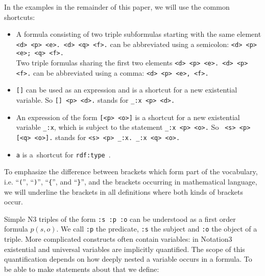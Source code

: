 In the examples in the remainder of this paper, we will use the common \rdf shortcuts:

\begin{remark}
\begin{itemize}
\item A formula consisting of two triple subformulas starting with the same element \verb!<d> <p> <e>. <d> <q> <f>.! can be abbreviated using a semicolon: \verb!<d> <p> <e>; <q> <f>.!\\ 
Two triple formulas sharing the first two elements  \verb!<d> <p> <e>. <d> <p> <f>.! can be abbreviated using a comma: \verb!<d> <p> <e>, <f>.!
  \item \verb![]! can be used as an expression and is a shortcut for a new existential variable. So \verb![] <p> <d>.! stands for \verb!_:x <p> <d>.!
 \item An expression of the form \verb![<p> <o>]! is a shortcut for a new existential variable \verb!_:x!,
   which is subject to the statement \verb!_:x <p> <o>.!
   So \verb! <s> <p> [<q> <o>].! stands for \verb!<s> <p> _:x. _:x <q> <o>.!
 \item \verb!a! is a~shortcut for \verb!rdf:type!~\cite{RDF}.
 \end{itemize}
\end{remark}

To emphasize the difference between brackets which form part of the \nthree vocabulary, i.e. ``\verb!(!'', ``\verb!)!'', ``\verb!{!'', and ``\verb!}!'', 
and the brackets occurring in mathematical language, we will underline the \nthree brackets in all definitions where both kinds of brackets occur.





Simple N3 triples of the form \verb!:s :p :o! can be understood as a first order formula $p(s,o)$. We call \texttt{:p} the predicate, \texttt{:s} 
 the subject and \texttt{:o} the object of a triple. More complicated constructs often contain variables:
in Notation3 existential and universal variables %
are implicitly quantified. The scope of this quantification depends on how deeply nested
a variable occurs in a formula. To be able to make statements about that we define:



